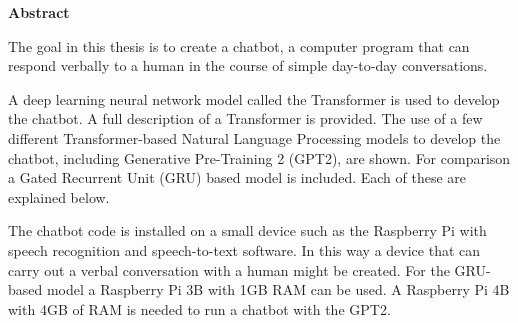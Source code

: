 
\begin{center}
	
\textbf{\Large Abstract}
\end{center}

	
The goal in this thesis is to create a chatbot, a computer program that can respond verbally to a human in the course of simple day-to-day conversations.

A deep learning neural network model called the Transformer is used to develop the chatbot. A full description of a Transformer is provided. The use of a few different Transformer-based Natural Language Processing models to develop the chatbot, including  Generative Pre-Training 2 (GPT2), are shown. For comparison a Gated Recurrent Unit (GRU) based model is included. Each of these are explained below.

The chatbot code is installed on a small device  such as the Raspberry Pi with speech recognition and speech-to-text software. In this way a device that can carry out a verbal conversation with a human  might be created. For the GRU-based model a Raspberry Pi 3B with 1GB RAM can be used. A Raspberry Pi 4B with 4GB of RAM is needed to run a chatbot with the GPT2. 

